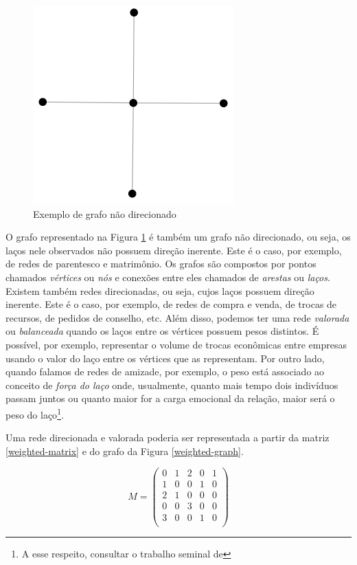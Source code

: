 \documentclass[a4paper, 12pt, openright, oneside, german, french, english, brazil]{abntex2}
\begin{document}
	
	\begin{figure}[!ht]
		\centering
		\caption{Exemplo de grafo não direcionado}
		\label{example-graph}
		\includegraphics[scale=.4]{example-graph.png}
	\end{figure}

	O grafo representado na Figura \ref{example-graph} é também um grafo não direcionado, ou seja, os laços nele observados não possuem direção inerente. Este é o caso, por exemplo, de redes de parentesco e matrimônio. Os grafos são compostos por pontos chamados \textit{vértices} ou \textit{nós} e conexões entre eles chamados de \textit{arestas} ou \textit{laços}. Existem também redes direcionadas, ou seja, cujos laços possuem direção inerente. Este é o caso, por exemplo, de redes de compra e venda, de trocas de recursos, de pedidos de conselho, etc. Além disso, podemos ter uma rede \textit{valorada} ou \textit{balanceada} quando os laços entre os vértices possuem pesos distintos. É possível, por exemplo, representar o volume de trocas econômicas entre empresas usando o valor do laço entre os vértices que as representam. Por outro lado, quando falamos de redes de amizade, por exemplo, o peso está associado ao conceito de \textit{força do laço} onde, usualmente, quanto mais tempo dois indivíduos passam juntos ou quanto maior for a carga emocional da relação, maior será o peso do laço\footnote{A esse respeito, consultar o trabalho seminal de }.
	
	Uma rede direcionada e valorada poderia ser representada a partir da matriz \ref{weighted-matrix} e do grafo da Figura \ref{weighted-graph}.
	
	\begin{equation}
	\label{weighted-matrix}
	M = \begin{pmatrix}
	0 & 1 & 2 & 0 & 1 \\
	1 & 0 & 0 & 1 & 0 \\
	2 & 1 & 0 & 0 & 0 \\
	0 & 0 & 3 & 0 & 0 \\
	3 & 0 & 0 & 1 & 0 \\
	\end{pmatrix}
	\end{equation}
	
\end{document}

